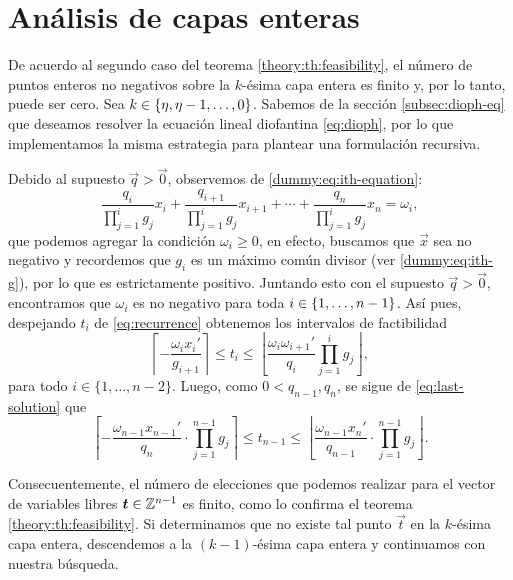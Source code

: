\section{Análisis de capas enteras}
\noindent
De acuerdo al segundo caso del teorema \ref{theory:th:feasibility}, el número de puntos enteros no
negativos sobre la $k$-ésima capa entera es finito y, por lo tanto, puede ser cero. Sea $k \in
\lbrace \eta, \eta - 1, \ldots, 0 \rbrace$. Sabemos de la sección \ref{subsec:dioph-eq} que deseamos resolver la
ecuación lineal diofantina \eqref{eq:dioph}, por lo que implementamos la misma estrategia para
plantear una formulación recursiva. 

Debido al supuesto $\vec{q} > \vec{0}$, observemos de \eqref{dummy:eq:ith-equation}:
\begin{equation*}
	\frac{q_i}{\prod_{j=1}^{i}g_j}x_i
	+ \frac{q_{i+1}}{\prod_{j=1}^{i}g_j}x_{i+1}
	+ \cdots
	+ \frac{q_{n}}{\prod_{j=1}^{i}g_j}x_n
	= \omega_i,
\end{equation*}
que podemos agregar la condición $\omega_{i} \geq 0$, en efecto, buscamos que $\vec{x}$ sea no
negativo y recordemos que $g_i$ es un máximo común divisor (ver \eqref{dummy:eq:ith-g}), por lo que
es estrictamente positivo. Juntando esto con el supuesto $\vec{q} > \vec{0}$, encontramos que
$\omega_i$ es no negativo para toda $i \in \lbrace 1, \ldots, n - 1 \rbrace$. Así pues, despejando $t_i$ de
\eqref{eq:recurrence} obtenemos los intervalos de factibilidad
\begin{equation*}
	\label{phase-1:finite:eq:param-bounds}
	\left\lceil -\frac{\omega_ix_i'}{g_{i+1}} \right\rceil
	\leq
	t_i
	\leq
	\left\lfloor \frac{\omega_i\omega_{i+1}'}{q_i} \prod_{j=1}^{i}g_j \right\rfloor,
\end{equation*}
para todo $i \in \lbrace 1, \ldots, n - 2\rbrace$. Luego, como $0 < q_{n - 1}, q_n$, se sigue de
\eqref{eq:last-solution} que
\begin{equation*}
	\label{phase-1:finite:eq:param-bounds-last}
	\left\lceil -\frac{\omega_{n-1}x_{n-1}'}{q_n} \cdot \prod_{j=1}^{n-1}g_j \right\rceil
	\leq
	t_{n - 1}
	\leq
	\left\lfloor \frac{\omega_{n-1}x_{n}'}{q_{n-1}} \cdot \prod_{j=1}^{n-1}g_j \right\rfloor.
\end{equation*}

Consecuentemente, el número de elecciones que podemos realizar para el vector
de variables libres $\boldsymbol{t} \in \mathbb{Z}^{n-1}$ es finito, como lo confirma el
teorema \ref{theory:th:feasibility}. Si determinamos que no existe tal punto
$\vec{t}$ en la $k$-ésima capa entera, descendemos a la $(k -1)$-ésima capa
entera y continuamos con nuestra búsqueda.

